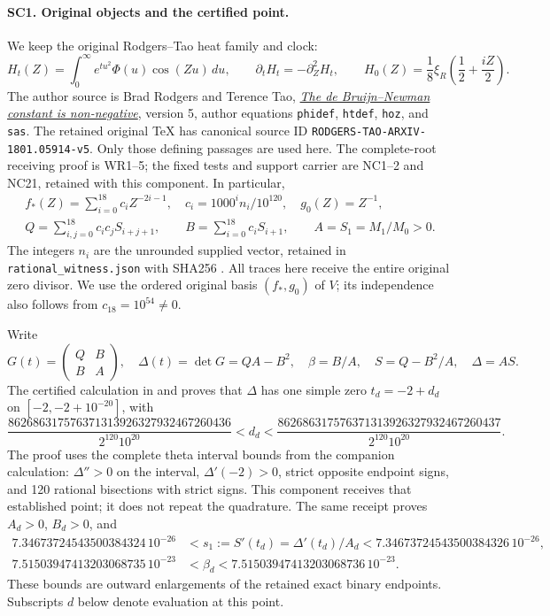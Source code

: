 \documentclass[11pt,a4paper]{article}
\theoremstyle{definition}\newtheorem{definition}[theorem]{Definition}
\newcommand{\B}{\mathbb B}\newcommand{\N}{\mathbb N}
\begin{document}
\paragraph{SC1. Original objects and the certified point.}
We keep the original Rodgers--Tao heat family and clock:
\[
 H_t(Z)=\int_0^\infty e^{tu^2}\Phi(u)\cos(Zu)\,du,\qquad
 \partial_tH_t=-\partial_Z^2H_t,\qquad
 H_0(Z)=\frac18\xi_R\!\left(\frac12+\frac{iZ}{2}\right).
 \tag{SC1}
\]
The author source is Brad Rodgers and Terence Tao,
\href{https://arxiv.org/abs/1801.05914v5}{\emph{The de Bruijn--Newman
constant is non-negative}}, version 5, author equations
\texttt{phidef}, \texttt{htdef}, \texttt{hoz}, and \texttt{sas}.
The retained original TeX has canonical source ID
\texttt{RODGERS-TAO-ARXIV-1801.05914-v5}.
Only those defining passages are used here. The complete-root
receiving proof is WR1--5; the fixed tests and support carrier are
NC1--2 and NC21, retained with this component. In particular,
\[
 \begin{gathered}
 f_*(Z)=\sum_{i=0}^{18}c_iZ^{-2i-1},\quad
 c_i=1000^i n_i/10^{120},\quad g_0(Z)=Z^{-1},\\
 Q=\sum_{i,j=0}^{18}c_ic_jS_{i+j+1},\qquad
 B=\sum_{i=0}^{18}c_iS_{i+1},\qquad A=S_1=M_1/M_0>0 .
 \end{gathered}\tag{SC2}
\]
The integers \(n_i\) are the unrounded supplied vector, retained in
\texttt{rational\_witness.json} with SHA256
.
All traces here receive the entire original zero divisor. We use
the ordered original basis \((f_*,g_0)\) of \(V\); its independence
also follows from \(c_{18}=10^{54}\ne0\).

Write
\[
 G(t)=\begin{pmatrix}Q&B\\B&A\end{pmatrix},\quad
 \Delta(t)=\det G=QA-B^2,\quad
 \beta=B/A,\quad S=Q-B^2/A,\quad \Delta=AS.
 \tag{SC3}
\]
The certified calculation in
 and
 proves that \(\Delta\) has
one simple zero \(t_d=-2+d_d\) on \([-2,-2+10^{-20}]\), with
\[
 \frac{862686317576371313926327932467260436}{2^{120}10^{20}}
 <d_d<
 \frac{862686317576371313926327932467260437}{2^{120}10^{20}}.
 \tag{SC4}
\]
The proof uses the complete theta interval bounds from the
companion calculation: \(\Delta''>0\) on the interval,
\(\Delta'(-2)>0\), strict opposite endpoint signs, and 120
rational bisections with strict signs. This component receives
that established point; it does not repeat the quadrature.
The same receipt proves \(A_d>0\), \(B_d>0\), and
\[
 \begin{split}
 7.34673724543500384324\,10^{-26}
 &<s_1:=S'(t_d)=\Delta'(t_d)/A_d
 <7.34673724543500384326\,10^{-26},\\
 7.51503947413203068735\,10^{-23}
 &<\beta_d<7.51503947413203068736\,10^{-23}.
 \end{split}\tag{SC5}
\]
These bounds are outward enlargements of the retained exact binary
endpoints. Subscripts \(d\) below denote evaluation at this point.
\end{document}
